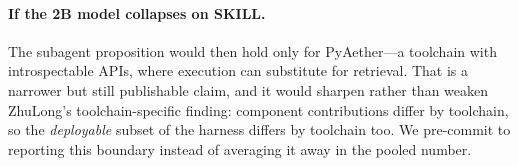 \paragraph{If the 2B model collapses on SKILL.}
The subagent proposition would then hold only for PyAether---a toolchain with introspectable APIs, where execution can substitute for retrieval.
That is a narrower but still publishable claim, and it would sharpen rather than weaken ZhuLong's toolchain-specific finding: component contributions differ by toolchain, so the \emph{deployable} subset of the harness differs by toolchain too.
We pre-commit to reporting this boundary instead of averaging it away in the pooled number.
